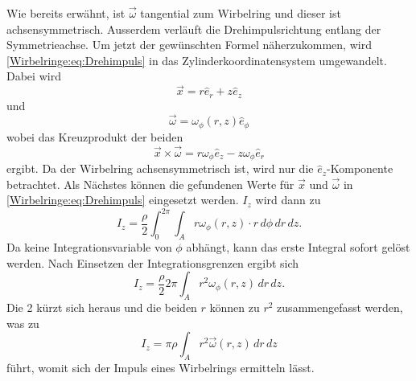 Wie bereits erwähnt, ist \(\vec{\omega}\) tangential zum Wirbelring und dieser ist achsensymmetrisch.
Ausserdem verläuft die Drehimpulsrichtung entlang der Symmetrieachse.
Um jetzt der gewünschten Formel näherzukommen, wird \eqref{Wirbelringe:eq:Drehimpuls} in das Zylinderkoordinatensystem umgewandelt.
Dabei wird
\begin{equation*}
    \vec{x}
    =
    r\hat{e}_r + z\hat{e}_z
\end{equation*}
und
\begin{equation*}
    \vec{\omega}
    =
    \omega_\phi(r,z)\hat{e}_\phi
\end{equation*}
wobei das Kreuzprodukt der beiden 
\begin{equation*}
    \vec{x}\times\vec{\omega}
    =
    r\omega_\phi\hat{e}_z - z\omega_\phi\hat{e}_r
\end{equation*}
ergibt. 
Da der Wirbelring achsensymmetrisch ist, wird nur die \(\hat{e}_z\)-Komponente betrachtet.
Als Nächstes können die gefundenen Werte für \(\vec{x}\) und \(\vec{\omega}\) in \eqref{Wirbelringe:eq:Drehimpuls} eingesetzt werden.
\(I_z\) wird dann zu
\begin{equation*}
    I_z
    =
    \frac{\rho}{2}\int_{0}^{2\pi}\int_{A}r\omega_\phi(r,z)\cdot r\,d\phi \,dr\,dz.
\end{equation*}
Da keine Integrationsvariable von \(\phi\) abhängt, kann das erste Integral sofort gelöst werden. 
Nach Einsetzen der Integrationsgrenzen ergibt sich
\begin{equation*}
    I_z
    =
    \frac{\rho}{2}2\pi\int_{A}r^2\omega_\phi(r,z)\,dr\,dz.
\end{equation*}
Die 2 kürzt sich heraus und die beiden \(r\) können zu \(r^2\) zusammengefasst werden, was zu
\begin{equation}
    I_z
    =
    \pi\rho\int_{A}r^2\vec{\omega}(r,z)\,dr\,dz
    \label{Wirbelringe:eq:achssymImp}
\end{equation}
führt, womit sich der Impuls eines Wirbelrings ermitteln lässt.


